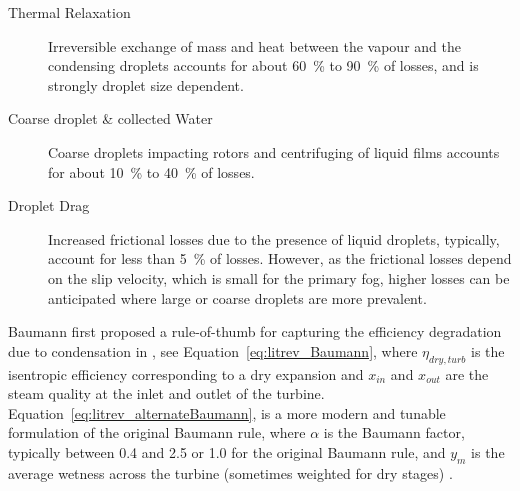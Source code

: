         \begin{description}
            \item[Thermal Relaxation] Irreversible exchange of mass and heat between the vapour and the condensing droplets accounts for about \qty{60}{\percent} to \qty{90}{\percent} of losses, and is strongly droplet size dependent.
            \item[Coarse droplet \& collected Water] Coarse droplets impacting rotors and centrifuging of liquid films accounts for about \qty{10}{\percent} to \qty{40}{\percent} of losses.
            \item[Droplet Drag] Increased frictional losses due to the presence of liquid droplets, typically, account for less than \qty{5}{\percent} of losses. However, as the frictional losses depend on the slip velocity, which is small for the primary fog, higher losses can be anticipated where large or coarse droplets are more prevalent.
        \end{description}


        Baumann \cite{Baumann1921} first proposed a rule-of-thumb for capturing the efficiency degradation due to condensation in \citeyear{Baumann1921}, see Equation~\ref{eq:litrev_Baumann}, where \(\eta_{dry, turb}\) is the isentropic efficiency corresponding to a dry expansion and \(x_{in}\) and \(x_{out}\) are the steam quality at the inlet and outlet of the turbine. Equation~\ref{eq:litrev_alternateBaumann}, is a more modern and tunable formulation of the original Baumann rule, where \(\alpha\) is the Baumann factor, typically between \num{0.4} and \num{2.5} or \num{1.0} for the original Baumann rule, and \(y_m\) is the average wetness across the turbine (sometimes weighted for dry stages) \cite{Senoo2017}.


